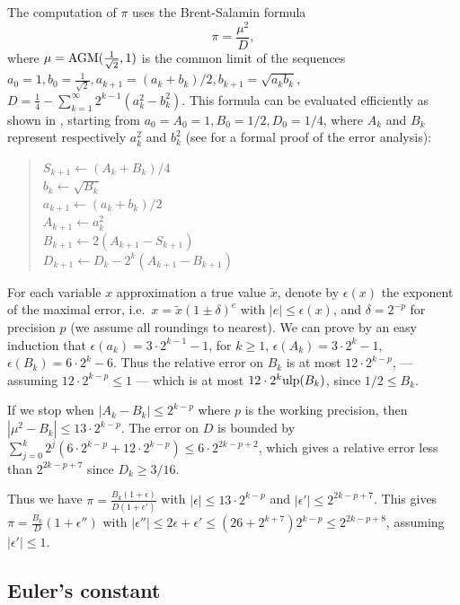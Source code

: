 \documentclass[12pt]{amsart}
\def\ulp{{\rm ulp}}
\begin{document}
The computation of $\pi$ uses the Brent-Salamin formula
\[ \pi = \frac{\mu^2}{D}, \]
where $\mu = {\rm AGM}(\frac{1}{\sqrt{2}}, 1)$ is the common limit
of the sequences $a_0=1, b_0 = \frac{1}{\sqrt{2}},
a_{k+1} = (a_k+b_k)/2, b_{k+1} = \sqrt{a_k b_k}$,
$D=\frac{1}{4} - \sum_{k=1}^{\infty} 2^{k-1} (a_k^2-b_k^2)$.
This formula can be evaluated efficiently as shown in \cite{ScGrVe94},
starting from $a_0 = A_0 = 1, B_0 = 1/2, D_0 = 1/4$, where $A_k$ and
$B_k$ represent respectively $a_k^2$ and $b_k^2$
(see \cite{bertot:hal-01582524} for a formal proof of the error analysis):
\begin{quote}
$S_{k+1} \leftarrow (A_k + B_k)/4$ \\
$b_k \leftarrow \sqrt{B_k}$ \\
$a_{k+1} \leftarrow (a_k + b_k)/2$ \\
$A_{k+1} \leftarrow a_k^2$ \\
$B_{k+1} \leftarrow 2 (A_{k+1} - S_{k+1})$ \\
$D_{k+1} \leftarrow D_k - 2^k (A_{k+1} - B_{k+1})$
\end{quote}
For each variable $x$ approximation a true value $\tilde{x}$,
denote by $\epsilon(x)$ the exponent of the maximal error,
i.e.\ $x = \tilde{x} (1\pm\delta)^e$ with $|e| \leq \epsilon(x)$,
and $\delta = 2^{-p}$ for precision $p$ (we assume all roundings to
nearest).
We can prove by an easy induction that $\epsilon(a_k) = 3 \cdot 2^{k-1} - 1$,
for $k \geq 1$, $\epsilon(A_k) = 3 \cdot 2^k - 1$,
$\epsilon(B_k) = 6 \cdot 2^k - 6$.
Thus the relative error on $B_k$ is at most $12 \cdot 2^{k-p}$,
--- assuming $12 \cdot 2^{k-p} \leq 1$ ---
which is at most $12 \cdot 2^k \ulp(B_k)$, since $1/2 \leq B_k$.

If we stop when $|A_k-B_k| \leq 2^{k-p}$ where $p$ is the working precision,
then $|\mu^2 - B_k| \leq 13 \cdot 2^{k-p}$.
The error on $D$ is bounded by $\sum_{j=0}^k 2^{j} (6 \cdot 2^{k-p} +
12 \cdot 2^{k-p}) \leq 6 \cdot 2^{2k-p+2}$, which gives a relative error less
than $2^{2k-p+7}$ since $D_k \geq 3/16$.

Thus we have $\pi = \frac{B_k (1+\epsilon)}{D (1+\epsilon')}$
with $|\epsilon| \leq 13 \cdot 2^{k-p}$ and $|\epsilon'| \leq 2^{2k-p+7}$.
This gives $\pi = \frac{B_k}{D} (1+\epsilon'')$ with
$|\epsilon''| \leq 2 \epsilon + \epsilon' \leq (26 + 2^{k+7}) 2^{k-p}
\leq 2^{2k-p+8}$, assuming $|\epsilon'| \leq 1$.

\subsection{Euler's constant} \label{gamma}
\end{document}
